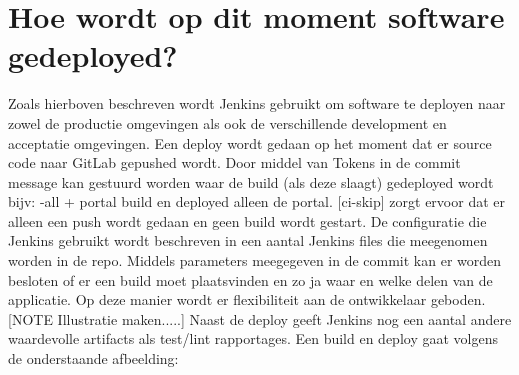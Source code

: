 \section{Hoe wordt op dit moment software gedeployed?}\label{sec:hoe-wordt-op-dit-moment-software-gedeployed?}
Zoals hierboven beschreven wordt Jenkins gebruikt om software te deployen naar zowel de productie omgevingen als ook de verschillende development en acceptatie omgevingen. Een deploy wordt gedaan op het moment dat er source code naar GitLab gepushed wordt. Door middel van Tokens in de commit message kan gestuurd worden waar de build (als deze slaagt) gedeployed wordt bijv: {-all + portal} build en deployed alleen de portal. [ci-skip] zorgt ervoor dat er alleen een push wordt gedaan en geen build wordt gestart.
De configuratie die Jenkins gebruikt wordt beschreven in een aantal Jenkins files die meegenomen worden in de repo. Middels parameters meegegeven in de commit kan er worden besloten of er een build moet plaatsvinden en zo ja waar en welke delen van de applicatie. Op deze manier wordt er flexibiliteit aan de ontwikkelaar geboden.
[NOTE Illustratie maken.....]
Naast de deploy geeft Jenkins nog een aantal andere waardevolle artifacts als test/lint rapportages.
Een build en deploy gaat volgens de onderstaande afbeelding:

